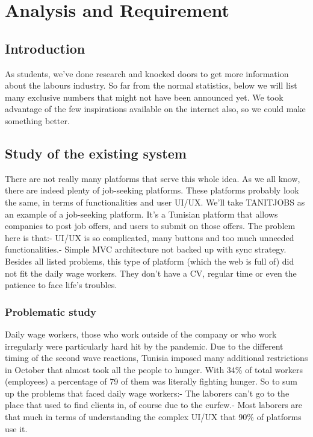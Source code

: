 \documentclass[12pt]{report}
\begin{document}
\chapter{Analysis and Requirement}
\renewcommand{\thesection}{\arabic{section}}
\section*{Introduction}
As students, we've done research and knocked doors to get more information about the labours industry.
So far from the normal statistics, below we will list many exclusive numbers that might not have been announced yet.
We took advantage of the few inspirations available on the internet also, so we could make something better.

\section{Study of the existing system}
There are not really many platforms that serve this whole idea. As we all know, there are indeed plenty of job-seeking platforms. These platforms probably look the same, in terms of functionalities and user UI/UX.
We'll take TANITJOBS as an example of a job-seeking platform.
It's a Tunisian platform that allows companies to post job offers, and users to submit on those offers. The problem here is that:- UI/UX is so complicated, many buttons and too much unneeded functionalities.- Simple MVC architecture not backed up with sync strategy.
Besides all listed problems, this type of platform (which the web is full of) did not fit the daily wage workers.
They don't have a CV, regular time or even the patience to face life's troubles.
\subsection{Problematic study}
Daily wage workers, those who work outside of the company or who work irregularly were particularly hard hit by the pandemic. Due to the different timing of the second wave reactions, Tunisia imposed many additional restrictions in October that almost took all the people to hunger.
With 34\% of total workers (employees) a percentage of 79 of them was literally fighting hunger.\newline
So to sum up the problems that faced daily wage workers:- The laborers can't go to the place that used to find clients in, of course due to the curfew.- Most laborers are that much in terms of understanding the complex UI/UX that 90\% of platforms use it.
\end{document}
